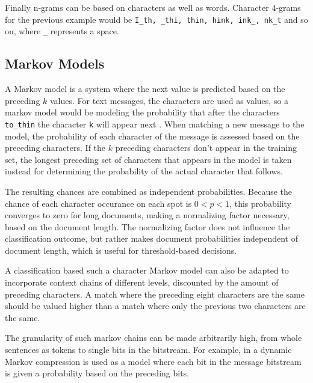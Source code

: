 \documentclass[runningheads,a4paper]{llncs}
\begin{document}
Finally n-grams can be based on characters as well as words. Character 4-grams for the 
previous example would be \texttt{I\_th, \_thi, thin, hink, ink\_, nk\_t} and so on, where 
\texttt{\_} represents a space.

\subsection{Markov Models}
A Markov model is a system where the next value is predicted based on the preceding $k$ values. 
For text messages, the characters are used as values, so a markov model would be modeling the
probability that after the characters \texttt{to\_thin} the character \texttt{k} will appear
next \cite{2005markovcharacter}. When matching a new message to the model, the probability of
each character of the message is assessed based on the preceding characters. If the $k$ 
preceding characters don't appear in the training set, the longest preceding set of
characters that appears in the model is taken instead for determining the probability of the 
actual character that follows.

The resulting chances are combined as independent probabilities. Because the chance of each 
character occurance on each spot is $0<p<1$, this probability converges to zero for long 
documents, making a normalizing factor necessary, based on the document length.\cite{2005markovcharacter} The 
normalizing factor does not influence the classification outcome, but rather makes document 
probabilities independent of document length, which is useful for threshold-based decisions.

A classification based such a character Markov model can also be adapted to incorporate context 
chains of different levels, discounted by the amount of preceding characters. A match where 
the preceding eight characters are the same should be valued higher than a match where only the 
previous two characters are the same.

The granularity of such markov chains can be made arbitrarily high, from whole sentences 
as tokens to single bits in the bitstream. For example, in \cite{2005markovstatistical} 
a dynamic Markov compression is used as a model where each bit in the message 
bitstream is given a probability based on the preceding bits. 
\end{document}
